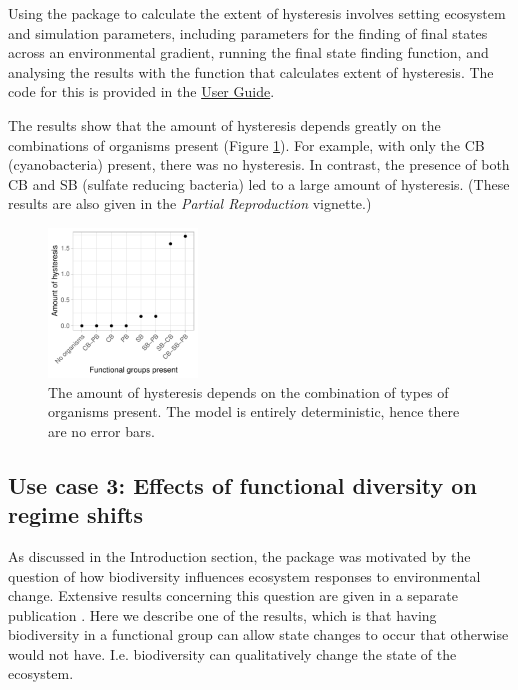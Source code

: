 \documentclass[]{elsarticle} %
\begin{document}
Using the package to calculate the extent of hysteresis involves setting ecosystem and simulation parameters, including parameters for the finding of final states across an environmental gradient, running the final state finding function, and analysing the results with the function that calculates extent of hysteresis. The code for this is provided in the \href{https://uzh-peg.r-universe.dev/articles/microxanox/User-guide.html}{User Guide}.

The results show that the amount of hysteresis depends greatly on the combinations of organisms present (Figure \ref{fig:uc2}). For example, with only the CB (cyanobacteria) present, there was no hysteresis. In contrast, the presence of both CB and SB (sulfate reducing bacteria) led to a large amount of hysteresis. (These results are also given in the \emph{Partial Reproduction} vignette.)

\begin{figure}

{\centering \includegraphics[width=150px]{figures/gen_uc2_user_guide_hysteresis} 

}

\caption{The amount of hysteresis depends on the combination of types of organisms present. The model is entirely deterministic, hence there are no error bars.}\label{fig:uc2}
\end{figure}

\hypertarget{use-case-3-effects-of-functional-diversity-on-regime-shifts}{%
\subsection{Use case 3: Effects of functional diversity on regime shifts}\label{use-case-3-effects-of-functional-diversity-on-regime-shifts}}

As discussed in the Introduction section, the package was motivated by the question of how biodiversity influences ecosystem responses to environmental change. Extensive results concerning this question are given in a separate publication \citet{Limberger2023}. Here we describe one of the results, which is that having biodiversity in a functional group can allow state changes to occur that otherwise would not have. I.e. biodiversity can qualitatively change the state of the ecosystem.
\end{document}
